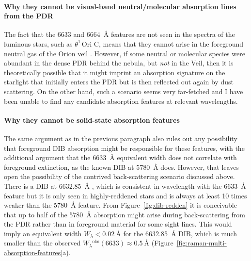 \documentclass[useAMS, usenatbib, a4paper]{mnras}
\def\th#1#2{\ensuremath{\theta^{#1}\,\text{Ori~#2}}}
\newcommand\observed{\ensuremath{^{\text{obs}}}}
\begin{document}
\paragraph*{Why they cannot be visual-band neutral/molecular absorption lines from the PDR}
\label{sec:cannot-be-abs}

The fact that the \num{6633} and \SI{6664}{\angstrom} features are not seen
in the spectra of the luminous stars, such as \th1C,
means that they cannot arise in the foreground neutral gas of the Orion veil
\citep{Abel:2004a, Abel:2019a}.
However, if some neutral or molecular species were abundant in the dense PDR behind the nebula,
but \emph{not} in the Veil,
then it is theoretically possible that it might imprint an absorption signature
on the starlight that initially enters the PDR but is then reflected out again
by dust scattering.
On the other hand,
such a scenario seems very far-fetched and I have been unable to find
any candidate absorption features at relevant wavelengths.

\paragraph*{Why they cannot be solid-state absorption features}
\label{sec:cannot-be-solid}

The same argument as in the previous paragraph also rules out any possibility
that foreground DIB absorption might be responsible for these features,
with the additional argument that the \SI{6633}{\angstrom}
equivalent width does not correlate with foreground extinction,
as the known DIB at \SI{5780}{\angstrom} does.
However, that leaves open the possibility of the contrived back-scattering scenario discussed above. 
There is a DIB at \SI{6632.85}{\angstrom} \citep{Galazutdinov:2000a},
which is consistent in wavelength with the \SI{6633}{\angstrom} feature
but it is only seen in highly-reddened stars
and is always at least 10 times weaker than the \SI{5780}{\angstrom} feature.
From Figure~\ref{fig:dib-redden} it is conceivable that up to half of the
\SI{5780}{\angstrom} absorption might arise during back-scattering from the PDR rather than in foreground material for some sight lines. 
This would imply an equivalent width \(W_\lambda < \SI{0.02}{\angstrom}\)
for the \SI{6632.85}{\angstrom} DIB,
which is much smaller than the observed \(W_\lambda\observed(6633) \approx \SI{0.5}{\angstrom}\)
(Figure~\ref{fig:raman-multi-absorption-features}a).


\end{document}
